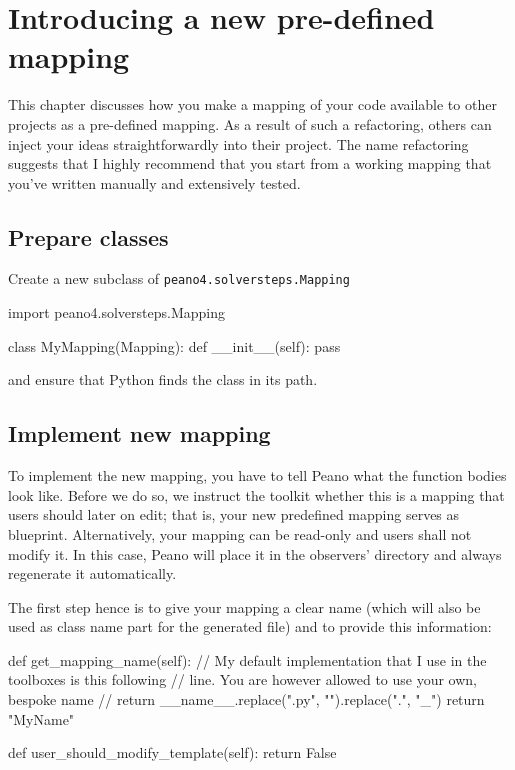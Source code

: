 \chapter{Introducing a new pre-defined mapping}
\label{section:new-mapping}

This chapter discusses how you make a mapping of your code available to other
projects as a pre-defined mapping.
As a result of such a refactoring, others can inject your ideas
straightforwardly into their project.
The name refactoring suggests that I highly recommend that you start from a
working mapping that you've written manually and extensively tested.

\section{Prepare classes}

Create a new subclass of \texttt{peano4.solversteps.Mapping}

\begin{code}
import peano4.solversteps.Mapping

class MyMapping(Mapping):
  def __init__(self):
    pass
\end{code}

\noindent
and ensure that Python finds the class in its path.


\section{Implement new mapping}

To implement the new mapping, you have to tell Peano what the function bodies
look like.
Before we do so, we instruct the toolkit whether this is a mapping that users
should later on edit; 
that is, your new predefined mapping serves as blueprint.
Alternatively, your mapping can be read-only and users shall not modify it.
In this case, Peano will place it in the observers' directory and always
regenerate it automatically.


The first step hence is to give your mapping a clear name (which will also be
used as class name part for the generated file) and to provide this information:


\begin{code}
  def get_mapping_name(self):
    // My default implementation that I use in the toolboxes is this following
    // line. You are however allowed to use your own, bespoke name
    // return __name__.replace(".py", "").replace(".", "_")
    return "MyName"

  def user_should_modify_template(self):
    return False
\end{code}


